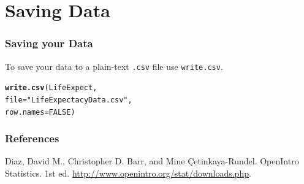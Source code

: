 \documentclass{beamer}\usepackage{graphicx, color}
\makeatletter
\newcommand{\hlfunctioncall}[1]{\textcolor[rgb]{0.501960784313725,0,0.329411764705882}{\textbf{#1}}}%
\newcommand{\hlstring}[1]{\textcolor[rgb]{0.6,0.6,1}{#1}}%
\newenvironment{kframe}{%
 \def\at@end@of@kframe{}%
 \ifinner\ifhmode%
  \def\at@end@of@kframe{\end{minipage}}%
  \begin{minipage}{\columnwidth}%
 \fi\fi%
 \def\FrameCommand##1{\hskip\@totalleftmargin \hskip-\fboxsep
 \colorbox{shadecolor}{##1}\hskip-\fboxsep
     \hskip-\linewidth \hskip-\@totalleftmargin \hskip\columnwidth}%
 \MakeFramed {\advance\hsize-\width
   \@totalleftmargin\z@ \linewidth\hsize
   \@setminipage}}%
 {\par\unskip\endMakeFramed%
 \at@end@of@kframe}
\newenvironment{knitrout}{}{} %
\makeatother
\begin{document}
\section{Saving Data}
\begin{frame}[fragile]
  \frametitle{Saving your Data}
  To save your data to a plain-text \texttt{.csv} file use \texttt{write.csv}.
\begin{knitrout}
\color{fgcolor}\begin{kframe}
\begin{alltt}
\hlfunctioncall{write.csv}(LifeExpect, 
            file = \hlstring{"LifeExpectacyData.csv"}, 
            row.names = FALSE)
\end{alltt}
\end{kframe}
\end{knitrout}

\end{frame}


\begin{frame}[allowframebreaks]
  \frametitle{References}
  Diaz, David M., Christopher D. Barr, and Mine \c{C}etinkaya-Rundel. OpenIntro Statistics. 1st ed. \url{http://www.openintro.org/stat/downloads.php}. \\[0.25cm] 
\end{frame}
\end{document}
